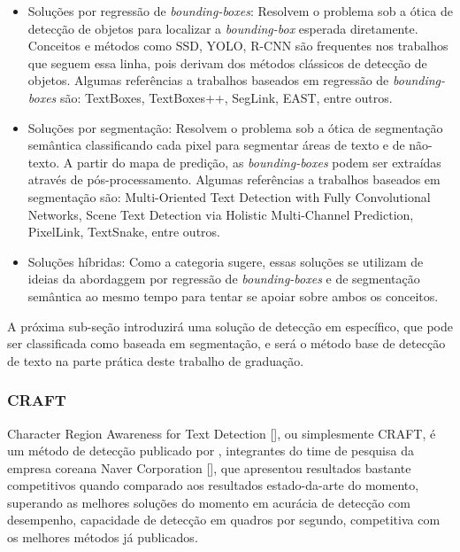 \begin{itemize}
    \item Soluções por regressão de \textit{bounding-boxes}: Resolvem o problema sob a ótica de detecção de objetos para localizar a \textit{bounding-box} esperada diretamente. Conceitos e métodos como SSD, YOLO, R-CNN são frequentes nos trabalhos que seguem essa linha, pois derivam dos métodos clássicos de detecção de objetos. Algumas referências a trabalhos baseados em regressão de \textit{bounding-boxes} são: TextBoxes, TextBoxes++, SegLink, EAST, entre outros.
    \item Soluções por segmentação: Resolvem o problema sob a ótica de segmentação semântica classificando cada pixel para segmentar áreas de texto e de não-texto. A partir do mapa de predição, as \textit{bounding-boxes} podem ser extraídas através de pós-processamento. Algumas referências a trabalhos baseados em segmentação são: Multi-Oriented Text Detection with Fully Convolutional Networks, Scene Text Detection via Holistic Multi-Channel Prediction, PixelLink, TextSnake, entre outros.
    \item Soluções híbridas: Como a categoria sugere, essas soluções se utilizam de ideias da abordaggem por regressão de \textit{bounding-boxes}  e de segmentação semântica ao mesmo tempo para tentar se apoiar sobre ambos os conceitos.
\end{itemize}

A próxima sub-seção introduzirá uma solução de detecção em específico, que pode ser classificada como baseada em segmentação, e será o método base de detecção de texto na parte prática deste trabalho de graduação.


\subsubsection{CRAFT}\label{craft}
Character Region Awareness for Text Detection [], ou simplesmente CRAFT, é um método de detecção publicado por \citeauthor{CRAFT}, integrantes do time de pesquisa da empresa coreana Naver Corporation [], que apresentou resultados bastante competitivos quando comparado aos resultados estado-da-arte do momento, superando as melhores soluções do momento em acurácia de detecção com desempenho, capacidade de detecção em quadros por segundo, competitiva com os melhores métodos já publicados.
	
